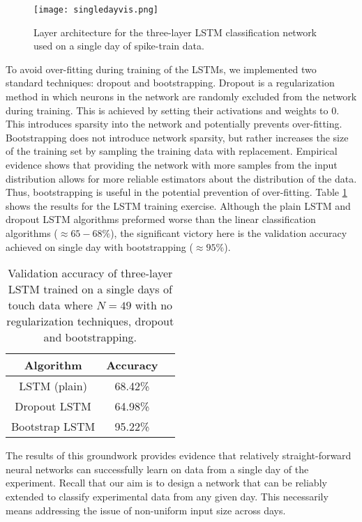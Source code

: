 \documentclass[12pt]{article}
\begin{document}
\begin{figure}
  \centering
  \texttt{[image: singledayvis.png]}
  \caption{Layer architecture for the three-layer LSTM classification network used on a single day of spike-train data.}
  \label{fig:lstm}
\end{figure}
\indent To avoid over-fitting during training of the LSTMs, we implemented two standard techniques: dropout and bootstrapping. Dropout is a regularization method in which neurons in the network are randomly excluded from the network during training. This is achieved by setting their activations and weights to 0. This introduces sparsity into the network and potentially prevents over-fitting. Bootstrapping does not introduce network sparsity, but rather increases the size of the training set by sampling the training data with replacement. Empirical evidence shows that providing the network with more samples from the input distribution allows for more reliable estimators about the distribution of the data. Thus, bootstrapping is useful in the potential prevention of over-fitting. Table \ref{tab:LSTM} shows the results for the LSTM training exercise. Although the plain LSTM and dropout LSTM algorithms preformed worse than the linear classification algorithms ($\approx 65-68\%$), the significant victory here is the validation accuracy achieved on single day with bootstrapping ($\approx 95\%$).

\begin{table}[]
  \centering
\begin{tabular}{|c|c|c|}
  \hline
                Algorithm    & Accuracy   \\
                      \hline
LSTM (plain) & 68.42\%   \\
  \hline
Dropout LSTM                 & 64.98\%     \\
  \hline
Bootstrap LSTM                 & 95.22\%     \\
\hline
\end{tabular}
\caption{Validation accuracy of three-layer LSTM trained on a single days of touch data where $N = 49$ with no regularization techniques, dropout and bootstrapping.}
\label{tab:LSTM}
\end{table}
The results of this groundwork provides evidence that relatively straight-forward neural networks can successfully learn on data from a single day of the experiment.  Recall that our aim is to design a network that can be reliably extended to classify experimental data from any given day. This necessarily means addressing the issue of non-uniform input size across days.
\end{document}
